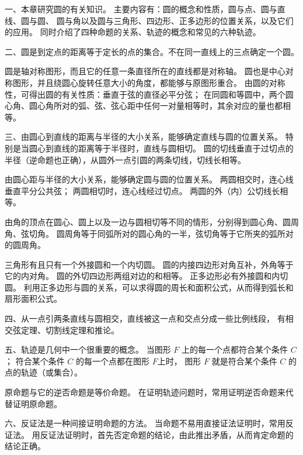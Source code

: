 \xiaojie

一、本章研究圆的有关知识。 主要内容有：圆的概念和性质，圆与点、圆与直线、圆与圆、
圆与角以及圆与三角形、四边形、正多边形的位置关系，以及它们的应用。
同时介绍了四种命题的关系、轨迹的概念和常见的六种轨迹。


二、圆是到定点的距离等于定长的点的集合。不在同一直线上的三点确定一个圆。

圆是轴对称图形，而且它的任意一条直径所在的直线都是对称轴。
圆也是中心对称图形，并且绕圆心旋转任意大小的角度，都能够与原图形重合。
由圆的对称性，可得出圆的有关性质：垂直于弦的直径必平分弦；
在同圆和等圆中，两个圆心角、圆心角所对的弧、弦、弦心距中任何一对量相等时，其余对应的量也都相等。


三、由圆心到直线的距离与半径的大小关系，能够确定直线与圆的位置关系。
特别是当圆心到直线的距离等于半径时，直线与圆相切。
圆的切线垂直于过切点的半径（逆命题也正确），从圆外一点引圆的两条切线，切线长相等。

由圆心距与半径的大小关系，能够确定圆与圆的位置关系。
两圆相交时，连心线垂直平分公共弦；
两圆相切时，连心线经过切点。
两圆的外（内）公切线长相等。

由角的顶点在圆心、圆上以及一边与圆相切等不同的情形，分别得到圆心角、圆周角、弦切角。
圆周角等于同弧所对的圆心角的一半，弦切角等于它所夹的弧所对的圆周角。

三角形有且只有一个外接圆和一个内切圆。
圆的内接四边形对角互补，外角等于它的内对角。
圆的外切四边形两组对边的和相等。
正多边形必有外接圆和内切圆。
利用正多边形与圆的关系，可以求得圆的周长和面积公式，从而得到弧长和扇形面积公式。


四、从一点引两条直线与圆相交，直线被这一点和交点分成一些比例线段，
有相交弦定理、切割线定理和推论。


五、轨迹是几何中一个很重要的概念。
当图形 $F$ 上的每一个点都符合某个条件 $C$；
符合某个条件 $C$ 的每一个点都在图形 $F$上时，
图形 $F$ 就是符合某个条件 $C$ 的点的轨迹（或集合）。

原命题与它的逆否命题是等价命题。
在证明轨迹问题时，常用证明逆否命题来代替证明原命题。


六、反证法是一种间接证明命题的方法。
当命题不易用直接证法证明时，常用反证法。
用反证法证明时，首先否定命题的结论，由此推出矛盾，从而肯定命题的结论正确。

